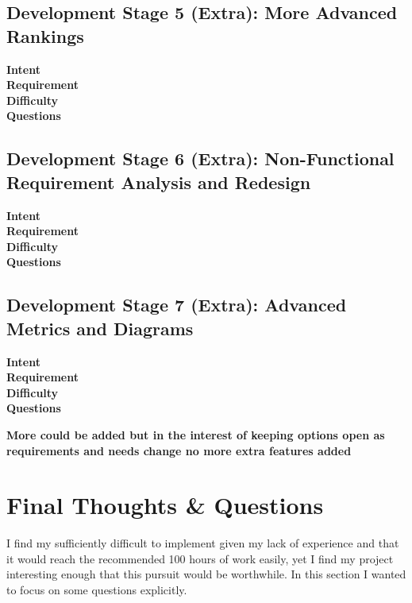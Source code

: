 \documentclass[11pt, a4paper]{article}
\begin{document}
\subsection{Development Stage 5 (Extra): More Advanced Rankings}

\begin{description}
\item[\textbf{Intent}]
\item[\textbf{Requirement}]
\item[\textbf{Difficulty}]
\item[\textbf{Questions}]
\end{description}

\subsection{Development Stage 6 (Extra): Non-Functional Requirement Analysis and Redesign}

\begin{description}
\item[\textbf{Intent}]
\item[\textbf{Requirement}]
\item[\textbf{Difficulty}]
\item[\textbf{Questions}]
\end{description}

\subsection{Development Stage 7 (Extra): Advanced Metrics and Diagrams}

\begin{description}
\item[\textbf{Intent}]
\item[\textbf{Requirement}]
\item[\textbf{Difficulty}]
\item[\textbf{Questions}]
\end{description}

\textbf{More could be added but in the interest of keeping options open as requirements and needs change no more extra features added} 

\section{Final Thoughts \& Questions}

I find my sufficiently difficult to implement given my lack of experience and that it would reach the recommended 100 hours of work easily, yet I find my project interesting enough that this pursuit would be worthwhile. In this section I wanted to focus on some questions explicitly.
\end{document}
